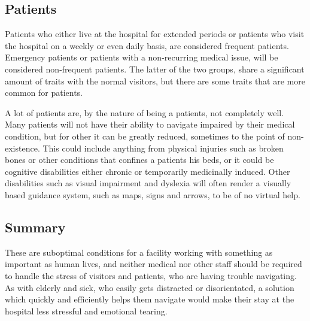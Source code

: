 \subsection{Patients}

Patients who either live at the hospital for extended periods or patients who visit the hospital on a weekly or even daily basis, are considered frequent patients. Emergency patients or patients with a non-recurring medical issue, will be considered non-frequent patients. The latter of the two groups, share a significant amount of traits with the normal visitors, but there are some traits that are more common for patients.

A lot of patients are, by the nature of being a patients, not completely well. Many patients will not have their ability to navigate impaired by their medical condition, but for other it can be greatly reduced, sometimes to the point of non-existence. This could include anything from physical injuries such as broken bones or other conditions that confines a patients his beds, or it could be cognitive disabilities either chronic or temporarily medicinally induced. Other disabilities such as visual impairment and dyslexia will often render a visually based guidance system, such as maps, signs and arrows, to be of no virtual help.\cite{visual_impairment}


\subsection{Summary}

These are suboptimal conditions for a facility working with something as important as human lives, and neither medical nor other staff should be required to handle the stress of visitors and patients, who are having trouble navigating. As with elderly and sick, who easily gets distracted or disorientated, a solution which quickly and efficiently helps them navigate would make their stay at the hospital less stressful and emotional tearing.